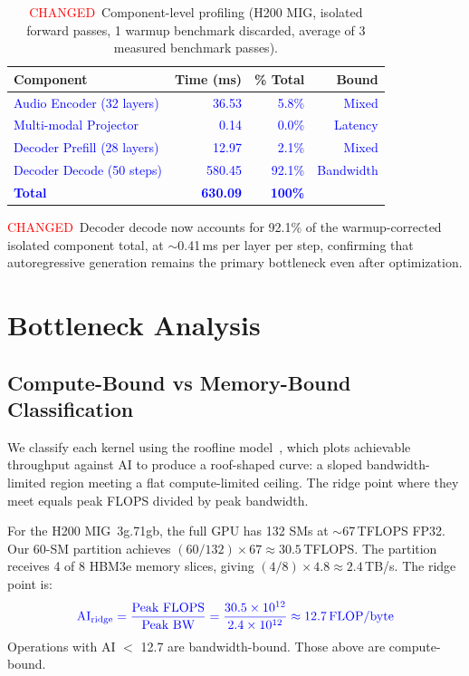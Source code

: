 \documentclass{article}
\newcommand{\chg}[1]{{\color{blue}#1}}
\newcommand{\chgcell}[1]{\textcolor{blue}{#1}}
\newcommand{\chglabel}{{\setlength{\fboxsep}{1pt}\colorbox{yellow!45}{\textcolor{red}{\scriptsize CHANGED}}}}
\begin{document}
\begin{table}[h]
\centering
\caption{\chglabel\ \chg{Component-level profiling (H200 MIG, isolated forward passes, 1 warmup benchmark discarded, average of 3 measured benchmark passes).}}
\label{tab:detailed}
\small
\begin{tabular}{@{}lrrr@{}}
\toprule
\textbf{Component} & \textbf{Time (ms)} & \textbf{\% Total} & \textbf{Bound} \\
\midrule
\chgcell{Audio Encoder (32 layers)} & \chgcell{36.53} & \chgcell{5.8\%} & \chgcell{Mixed} \\
\chgcell{Multi-modal Projector} & \chgcell{0.14} & \chgcell{0.0\%} & \chgcell{Latency} \\
\chgcell{Decoder Prefill (28 layers)} & \chgcell{12.97} & \chgcell{2.1\%} & \chgcell{Mixed} \\
\chgcell{Decoder Decode (50 steps)} & \chgcell{580.45} & \chgcell{92.1\%} & \chgcell{Bandwidth} \\
\midrule
\chgcell{\textbf{Total}} & \chgcell{\textbf{630.09}} & \chgcell{\textbf{100\%}} & \\
\bottomrule
\end{tabular}
\end{table}

\chglabel\ \chg{Decoder decode now accounts for 92.1\% of the warmup-corrected isolated component total, at $\sim$0.41\,ms per layer per step, confirming that autoregressive generation remains the primary bottleneck even after optimization.}

\section{Bottleneck Analysis}\label{sec:bottleneck}

\subsection{Compute-Bound vs Memory-Bound Classification}

We classify each kernel using the roofline model~\citep{williams2009roofline}, which plots achievable throughput against AI to produce a roof-shaped curve: a sloped bandwidth-limited region meeting a flat compute-limited ceiling.  The ridge point where they meet equals peak FLOPS divided by peak bandwidth.

For the H200 MIG~3g.71gb, the full GPU has 132 SMs at $\sim$67\,TFLOPS FP32. Our 60-SM partition achieves $(60/132) \times 67 \approx 30.5$\,TFLOPS.  The partition receives 4 of 8 HBM3e memory slices, giving $(4/8) \times 4.8 \approx 2.4$\,TB/s.  The ridge point is:
\begin{equation}
\chg{\text{AI}_{\text{ridge}} = \frac{\text{Peak FLOPS}}{\text{Peak BW}} = \frac{30.5 \times 10^{12}}{2.4 \times 10^{12}} \approx 12.7 \text{\,FLOP/byte}}
\end{equation}
Operations with AI $<$ 12.7 are bandwidth-bound. Those above are compute-bound.
\end{document}
